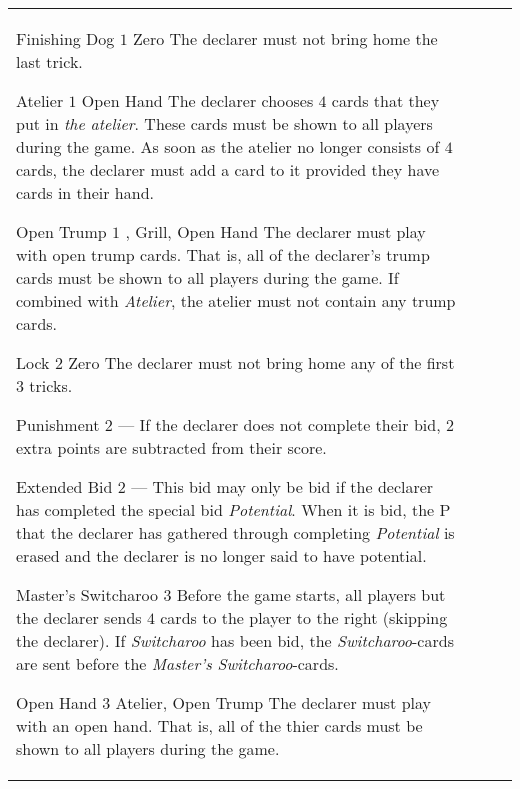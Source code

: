 \begin{table}
\begin{center}
\begin{tabularx}{\textwidth}{lcp{3cm}|X}
			\specialBidItem%
			{Finishing Dog}
			{$1$}
			{Zero}
			{%
				The declarer must not bring home the last trick.
			}

			\specialBidItem%
			{Atelier}
			{$1$}
			{Open Hand}
			{%
				The declarer chooses $4$ cards that they put in \emph{the atelier}. These cards must be shown to all players during the game. As soon as the atelier no longer consists of $4$ cards, the declarer must add a card to it provided they have cards in their hand.
			}

			\specialBidItem%
			{Open Trump}
			{$1$}
			{\nonTrump, Grill, Open Hand}
			{%
				The declarer must play with open trump cards. That is, all of the declarer’s trump cards must be shown to all players during the game. If combined with \emph{Atelier}, the atelier must not contain any trump cards.
			}

			\specialBidItem%
			{Lock}
			{$2$}
			{Zero}
			{%
				The declarer must not bring home any of the first $3$ tricks.
			}

			\specialBidItem%
			{Punishment}
			{$2$}
			{---}
			{%
				If the declarer does not complete their bid, $2$ extra points are subtracted from their score.
			}

			\specialBidItem%
			{Extended Bid}
			{$2$}
			{---}
			{%
				This bid may only be bid if the declarer has completed the special bid \emph{Potential}. When it is bid, the P that the declarer has gathered through completing \emph{Potential} is erased and the declarer is no longer said to have potential.
			}

			\specialBidItem%
			{Master's Switcharoo}
			{$3$}
			{\nonTrump}
			{%
				Before the game starts, all players but the declarer sends $4$ cards to the player to the right (skipping the declarer). If \emph{Switcharoo} has been bid, the \emph{Switcharoo}-cards are sent before the \emph{Master's Switcharoo}-cards.
			}

			\specialBidItem%
			{Open Hand}
			{$3$}
			{Atelier, Open Trump}
			{%
				The declarer must play with an open hand. That is, all of the thier cards must be shown to all players during the game.
			}
		\end{tabularx}
	\end{center}
\end{table}
